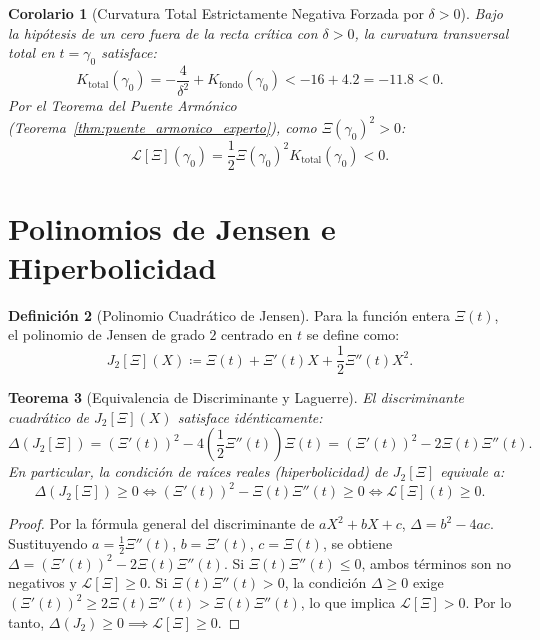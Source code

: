 \documentclass[11pt,a4paper]{article}
\newtheorem{theorem}{Teorema}[section]
\newtheorem{corollary}[theorem]{Corolario}
\theoremstyle{definition}
\newtheorem{definition}[theorem]{Definición}
\theoremstyle{remark}
\begin{document}
\begin{corollary}[Curvatura Total Estrictamente Negativa Forzada por $\delta > 0$]
\label{cor:curvatura_negativa_forzada}
Bajo la hipótesis de un cero fuera de la recta crítica con $\delta > 0$, la curvatura transversal total en $t = \gamma_0$ satisface:
\begin{equation}
K_{\mathrm{total}}(\gamma_0) = -\frac{4}{\delta^2} + K_{\mathrm{fondo}}(\gamma_0) < -16 + 4.2 = -11.8 < 0.
\end{equation}
Por el Teorema del Puente Armónico (Teorema~\ref{thm:puente_armonico_experto}), como $\Xi(\gamma_0)^2 > 0$:
\begin{equation}
\label{eq:laguerre_negativo_obligatorio}
\mathcal{L}[\Xi](\gamma_0) = \frac{1}{2} \Xi(\gamma_0)^2 K_{\mathrm{total}}(\gamma_0) < 0.
\end{equation}
\end{corollary}

\section{Polinomios de Jensen e Hiperbolicidad}

\begin{definition}[Polinomio Cuadrático de Jensen]
Para la función entera $\Xi(t)$, el polinomio de Jensen de grado $2$ centrado en $t$ se define como:
\begin{equation}
J_2[\Xi](X) \coloneqq \Xi(t) + \Xi'(t) X + \frac{1}{2} \Xi''(t) X^2.
\end{equation}
\end{definition}

\begin{theorem}[Equivalencia de Discriminante y Laguerre]
El discriminante cuadrático de $J_2[\Xi](X)$ satisface idénticamente:
\begin{equation}
\Delta(J_2[\Xi]) = (\Xi'(t))^2 - 4\left(\frac{1}{2}\Xi''(t)\right)\Xi(t) = (\Xi'(t))^2 - 2 \Xi(t)\Xi''(t).
\end{equation}
En particular, la condición de raíces reales (hiperbolicidad) de $J_2[\Xi]$ equivale a:
\begin{equation}
\Delta(J_2[\Xi]) \ge 0 \iff (\Xi'(t))^2 - \Xi(t)\Xi''(t) \ge 0 \iff \mathcal{L}[\Xi](t) \ge 0.
\end{equation}
\end{theorem}

\begin{proof}
Por la fórmula general del discriminante de $a X^2 + b X + c$, $\Delta = b^2 - 4ac$. Sustituyendo $a = \frac{1}{2}\Xi''(t)$, $b = \Xi'(t)$, $c = \Xi(t)$, se obtiene $\Delta = (\Xi'(t))^2 - 2\Xi(t)\Xi''(t)$. Si $\Xi(t)\Xi''(t) \le 0$, ambos términos son no negativos y $\mathcal{L}[\Xi] \ge 0$. Si $\Xi(t)\Xi''(t) > 0$, la condición $\Delta \ge 0$ exige $(\Xi'(t))^2 \ge 2\Xi(t)\Xi''(t) > \Xi(t)\Xi''(t)$, lo que implica $\mathcal{L}[\Xi] > 0$. Por lo tanto, $\Delta(J_2) \ge 0 \implies \mathcal{L}[\Xi] \ge 0$.
\end{proof}
\end{document}
